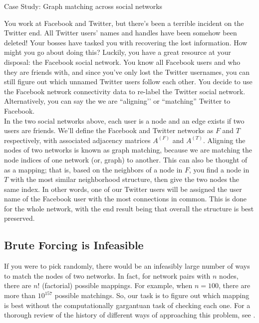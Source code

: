 \begin{floatingbox}[h]\caption{Case Study: Graph matching across social networks}
\label{box:ch8:gm:ex}
You work at Facebook and Twitter, but there’s been a terrible incident on the Twitter end. All Twitter users’ names and handles have been somehow been deleted! Your bosses have tasked you with recovering the lost information. How might you go about doing this? Luckily, you have a great resource at your disposal: the Facebook social network. You know all Facebook users and who they are friends with, and since you’ve only lost the Twitter usernames, you can still figure out which unnamed Twitter users follow each other. You decide to use the Facebook network connectivity data to re-label the Twitter social network. Alternatively, you can say the we are ``aligning’’ or ``matching'' Twitter to Facebook. \\

In the two social networks above, each user is a node and an edge exists if two users are friends. We'll define the Facebook and Twitter networks as $F$ and $T$ respectively, with associated adjacency matrices $A^{(F)}$ and $A^{(T)}$. Aligning the nodes of two networks is known as graph matching, because we are matching the node indices of one network (or, graph) to another. This can also be thought of as a mapping; that is, based on the neighbors of a node in $F$, you find a node in $T$ with the most similar neighborhood structure, then give the two nodes the same index. In other words, one of our Twitter users will be assigned the user name of the Facebook user with the most connections in common. This is done for the whole network, with the end result being that overall the structure is best preserved.
\end{floatingbox}

\subsection{Brute Forcing is Infeasible}
If you were to pick randomly, there would be an infeasibly large number of ways to match the nodes of two networks. In fact, for network pairs with $n$ nodes, there are $n!$ (factorial) possible mappings. For example, when $n=100$, there are more than $10^{157}$ possible matchings. So, our task is to figure out which mapping is best without the computationally gargantuan task of checking each one. For a thorough review of the history of different ways of approaching this problem, see \cite{Livi2013Aug}.

